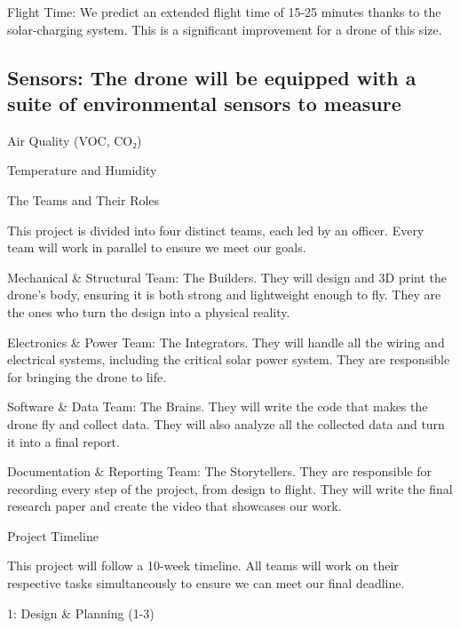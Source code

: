 \documentclass[11pt,letterpaper]{article}
\begin{document}
Flight Time: We predict an extended flight time of 15-25 minutes thanks to the solar-charging system. This is a significant improvement for a drone of this size.\par

\subsection{Sensors: The drone will be equipped with a suite of environmental sensors to measure}

Air Quality (VOC, CO₂)\par

Temperature and Humidity\par

The Teams and Their Roles\par

This project is divided into four distinct teams, each led by an officer. Every team will work in parallel to ensure we meet our goals.\par

Mechanical \& Structural Team: The Builders. They will design and 3D print the drone's body, ensuring it is both strong and lightweight enough to fly. They are the ones who turn the design into a physical reality.\par

Electronics \& Power Team: The Integrators. They will handle all the wiring and electrical systems, including the critical solar power system. They are responsible for bringing the drone to life.\par

Software \& Data Team: The Brains. They will write the code that makes the drone fly and collect data. They will also analyze all the collected data and turn it into a final report.\par

Documentation \& Reporting Team: The Storytellers. They are responsible for recording every step of the project, from design to flight. They will write the final research paper and create the video that showcases our work.\par

Project Timeline\par

This project will follow a 10-week timeline. All teams will work on their respective tasks simultaneously to ensure we can meet our final deadline.\par

1: Design \& Planning (1-3)\par
\end{document}
